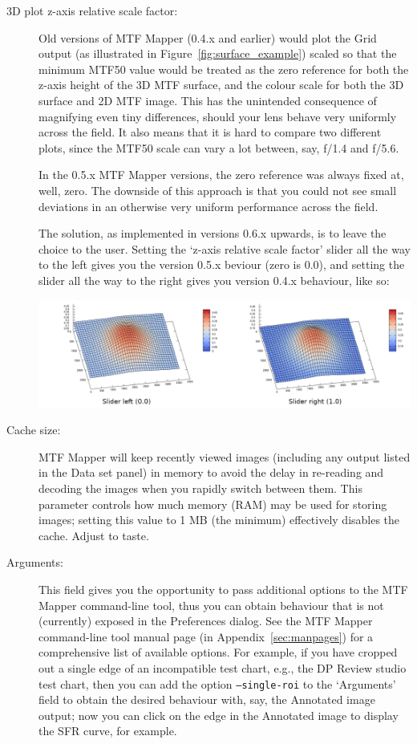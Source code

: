 \documentclass[a4paper]{article}
\begin{document}
\begin{description}
\item[3D plot z-axis relative scale factor:]
Old versions of MTF Mapper (0.4.x and earlier) would plot the \textsf{Grid}
output (as illustrated in Figure~\ref{fig:surface_example}) scaled so that
the minimum MTF50 value would be treated as the zero reference for both the
z-axis height of the 3D MTF surface, and the colour scale for both the 3D
surface and 2D MTF image. This has the unintended consequence of magnifying
even tiny differences, should your lens behave very uniformly across the
field. It also means that it is hard to compare two different plots, since
the MTF50 scale can vary a lot between, say, f/1.4 and f/5.6.

In the 0.5.x MTF Mapper versions, the zero reference was always fixed at,
well, zero. The downside of this approach is that you could not see small
deviations in an otherwise very uniform performance across the field.

The solution, as implemented in versions 0.6.x upwards, is to leave the
choice to the user. Setting the `z-axis relative scale factor' slider all
the way to the left gives you the version 0.5.x beviour (zero is 0.0), and setting the
slider all the way to the right gives you version 0.4.x behaviour, like so:

\parbox{0.85\textwidth}{
\centering
\includegraphics[width=\textwidth]{figures/z_axis_scale}
}

\item[Cache size:]
MTF Mapper will keep recently viewed images (including any output listed in
the \textsf{Data set} panel) in memory to avoid the delay in re-reading and
decoding the images when you rapidly switch between them. This parameter
controls how much memory (RAM) may be used for storing images; setting this
value to 1 MB (the minimum) effectively disables the cache. Adjust to taste.

\item[Arguments:]
This field gives you the opportunity to pass additional options to the MTF
Mapper command-line tool, thus you can obtain behaviour that is not
(currently) exposed in the \textsf{Preferences} dialog. See the MTF Mapper
command-line tool manual page (in Appendix~\ref{sec:manpages}) for a
comprehensive list of available options. For example, if you have cropped
out a single edge of an incompatible test chart, e.g., the DP Review studio test
chart, then you can add the option \texttt{--single-roi} to the `Arguments'
field to obtain the desired behaviour with, say, the \textsf{Annotated
image} output; now you can click on the edge in the \textsf{Annotated image}
to display the SFR curve, for example.


\end{description}
\end{document}
